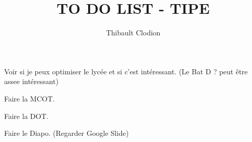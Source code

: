 \documentclass{article}
\title{TO DO LIST - TIPE}
\author{Thibault Clodion}
\begin{document}
\maketitle %

\begin{todolist}
    \item Voir si je peux optimiser le lycée et si c'est intéressant. (Le Bat D ? peut être assee intéressant)
    \item Faire la MCOT.
    \item Faire la DOT.
    \item Faire le Diapo. (Regarder Google Slide)
\end{todolist}
\end{document}
